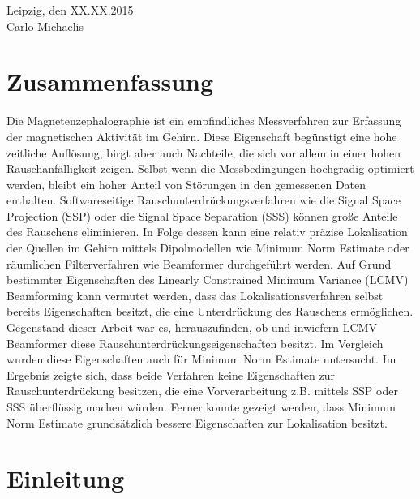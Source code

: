 \documentclass[doc,a4paper,12pt]{apa6}
\begin{document}
\vspace{3em}
\noindent Leipzig, den XX.XX.2015\\ Carlo Michaelis

\newpage

\section*{Zusammenfassung}

Die Magnetenzephalographie ist ein empfindliches Messverfahren zur Erfassung der magnetischen Aktivität im Gehirn. Diese Eigenschaft begünstigt eine hohe zeitliche Auflösung, birgt aber auch Nachteile, die sich vor allem in einer hohen Rauschanfälligkeit zeigen. Selbst wenn die Messbedingungen hochgradig optimiert werden, bleibt ein hoher Anteil von Störungen in den gemessenen Daten enthalten. Softwareseitige Rauschunterdrückungsverfahren wie die Signal Space Projection (SSP) oder die Signal Space Separation (SSS) können große Anteile des Rauschens eliminieren. In Folge dessen kann eine relativ präzise Lokalisation der Quellen im Gehirn mittels Dipolmodellen wie Minimum Norm Estimate oder räumlichen Filterverfahren wie Beamformer durchgeführt werden. Auf Grund bestimmter Eigenschaften des Linearly Constrained Minimum Variance (LCMV) Beamforming kann vermutet werden, dass das Lokalisationsverfahren selbst bereits Eigenschaften besitzt, die eine Unterdrückung des Rauschens ermöglichen. Gegenstand dieser Arbeit war es, herauszufinden, ob und inwiefern LCMV Beamformer diese Rauschunterdrückungseigenschaften besitzt. Im Vergleich wurden diese Eigenschaften auch für Minimum Norm Estimate untersucht. Im Ergebnis zeigte sich, dass beide Verfahren keine Eigenschaften zur Rauschunterdrückung besitzen, die eine Vorverarbeitung z.B. mittels SSP oder SSS überflüssig machen würden. Ferner konnte gezeigt werden, dass Minimum Norm Estimate grundsätzlich bessere Eigenschaften zur Lokalisation besitzt.

\newpage

\setcounter{tocdepth}{2}
\tableofcontents
\newpage

\listoffigures
\newpage

\section{Einleitung}
\end{document}

